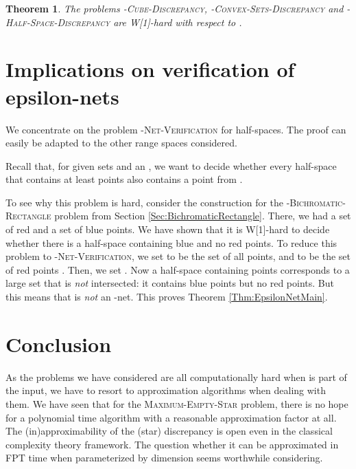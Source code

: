 \documentclass[12pt]{article}
\newtheorem{theorem}{Theorem}
\begin{document}
\begin{theorem}\label{Thm:OtherRanges} The problems -\textsc{Cube-Discrepancy}, -\textsc{Convex-Sets-Discrepancy} and -\textsc{Half-Space-Discrepancy} are W[1]-hard with respect to .
\end{theorem}





\section{Implications on verification of epsilon-nets}
We concentrate on the problem -\textsc{Net-Verification} for half-spaces. The proof can easily be adapted to the other range spaces considered.

Recall that, for given sets  and an , we want to decide whether every half-space that contains at least  points also contains a point from .

To see why this problem is hard, consider the construction for the -\textsc{Bichromatic-Rectangle} problem from Section \ref{Sec:BichromaticRectangle}. There, we had a set  of red and a set  of blue points. We have shown that it is W[1]-hard to decide whether there is a half-space containing  blue and no red points. To reduce this problem to -\textsc{Net-Verification}, we set  to be the set of all points, and  to be the set of red points . Then, we set . Now a  half-space containing  points corresponds to a large set that is \emph{not} intersected: it contains  blue points but no red points. But this means that  is \emph{not} an -net. This proves Theorem \ref{Thm:EpsilonNetMain}.




\section{Conclusion}

As the problems we have considered are all computationally hard when  is
part of the input, we have to resort to approximation algorithms when
dealing with them. We have seen that for the \textsc{Maximum-Empty-Star}
problem, there is no hope for a polynomial time algorithm with a reasonable
approximation factor at all.
The (in)approximability of the (star) discrepancy is open even in the
classical complexity theory framework. The question whether it can be
approximated in FPT time when parameterized by dimension seems worthwhile
considering.




\end{document}
